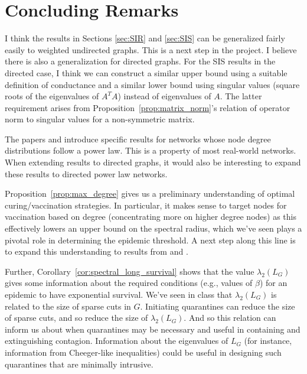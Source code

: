 \documentclass[11pt]{article}
\begin{document}
\section{Concluding Remarks}\label{sec:conclusion}

I think the results in Sections \ref{sec:SIR} and \ref{sec:SIS} can be generalized fairly easily to weighted undirected graphs. This is a next step in the project. I believe there is also a generalization for directed graphs. For the SIS results in the directed case, I think we can construct a similar upper bound using a suitable definition of conductance and a similar lower bound using singular values (square roots of the eigenvalues of $A^T A$) instead of eigenvalues of $A$. The latter requirement arises from Proposition~\ref{prop:matrix_norm}'s relation of operator norm to singular values for a non-symmetric matrix.

The papers \cite{draief:SIR_paper} and \cite{ganesh:SIS_paper} introduce specific results for networks whose node degree distributions follow a power law. This is a property of most real-world networks. When extending results to directed graphs, it would also be interesting to expand these results to directed power law networks.

Proposition~\ref{prop:max_degree} gives us a preliminary understanding of optimal curing/vaccination strategies. In particular, it makes sense to target nodes for vaccination based on degree (concentrating more on higher degree nodes) as this effectively lowers an upper bound on the spectral radius, which we've seen plays a pivotal role in determining the epidemic threshold. A next step along this line is to expand this understanding to results from \cite{borgs:curing_paper} and \cite{drakopoulos:curing_paper}.

Further, Corollary~\ref{cor:spectral_long_survival} shows that the value $\lambda_2(L_G)$ gives some information about the required conditions (e.g., values of $\beta$) for an epidemic to have exponential survival. We've seen in class that $\lambda_2(L_G)$ is related to the size of sparse cuts in $G$. Initiating quarantines can reduce the size of sparse cuts, and so reduce the size of $\lambda_2(L_G)$. And so this relation can inform us about when quarantines may be necessary and useful in containing and extinguishing contagion. Information about the eigenvalues of $L_G$ (for instance, information from Cheeger-like inequalities) could be useful in designing such quarantines that are minimally intrusive.
\end{document}
